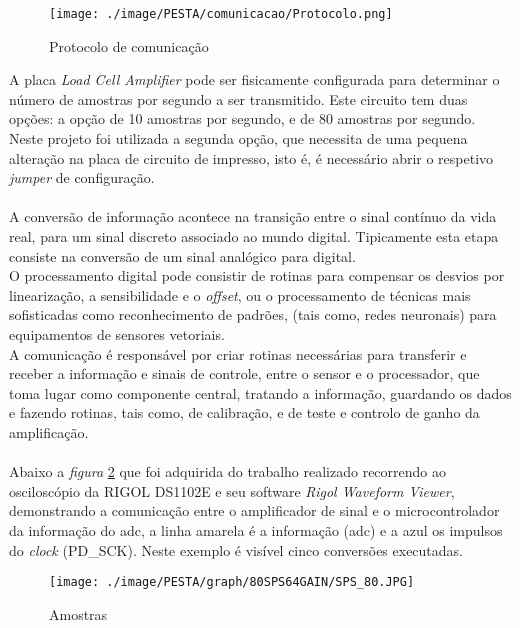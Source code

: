 \begin{figure}[H]
	\centering
	\texttt{[image: ./image/PESTA/comunicacao/Protocolo.png]}
	\caption{Protocolo de comunicação}
	\label{Protocolo}
\end{figure}
A placa \textit{Load Cell Amplifier} pode ser fisicamente configurada para determinar o número de amostras por segundo a ser transmitido. Este circuito tem duas opções: a opção de 10 amostras por segundo, e de 80 amostras por segundo. Neste projeto foi utilizada a segunda opção, que necessita de uma pequena alteração na placa de circuito de impresso, isto é, é necessário abrir o respetivo \textit{jumper} de configuração.
\\
\\
A conversão de informação acontece na transição entre o sinal contínuo da vida real, para um sinal discreto associado ao mundo digital. Tipicamente esta etapa consiste na conversão de um sinal analógico para digital.\cite{book-9}
\\
O processamento digital pode consistir de rotinas para compensar os desvios por linearização, a sensibilidade e o \textit{offset}, ou o processamento de técnicas mais sofisticadas como reconhecimento de padrões, (tais como, redes neuronais) para equipamentos de sensores vetoriais.\cite{book-9}
\\
A comunicação é responsável por criar rotinas necessárias para transferir e receber a informação e sinais de controle, entre o sensor e o processador, que toma lugar como componente central, tratando a informação, guardando os dados e fazendo rotinas, tais como, de calibração, e de teste e controlo de ganho da amplificação. \cite{book-9}
\\
\\
Abaixo a \textit{figura} \ref{SPS_64} que foi adquirida do trabalho realizado recorrendo ao osciloscópio da RIGOL DS1102E e seu software \textit{Rigol Waveform Viewer}, demonstrando a comunicação entre o amplificador de sinal e o microcontrolador da informação do \acs{adc}, a linha amarela é a informação (\acs{adc}) e a azul os impulsos do \textit{clock} (PD\_SCK). Neste exemplo é visível cinco conversões executadas.
\\
\begin{figure}[H]
	\centering
	\texttt{[image: ./image/PESTA/graph/80SPS64GAIN/SPS\_80.JPG]}
	\caption{Amostras}
	\label{SPS_64}
\end{figure}
